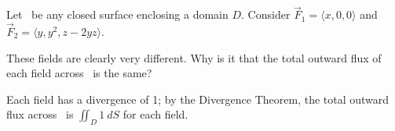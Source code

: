 {Let \surfaceS\ be any closed surface enclosing a domain $D$. Consider $\vec F_1 = \langle x,0,0\rangle$ and $\vec F_2=\langle y,y^2,z-2yz\rangle$. 

These fields are clearly very different. Why is it that the total outward flux of each field across \surfaceS\ is the same?
}
{Each field has a divergence of 1; by the Divergence Theorem, the total outward flux across \surfaceS\ is $\iint_D 1\ dS$ for each field.
}
